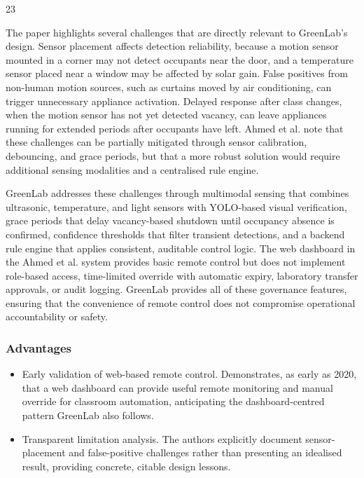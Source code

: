23


The paper highlights several challenges that are directly relevant to GreenLab's design. Sensor placement affects detection reliability, because a motion sensor mounted in
a corner may not detect occupants near the door, and a temperature sensor placed near a
window may be affected by solar gain. False positives from non-human motion sources,
such as curtains moved by air conditioning, can trigger unnecessary appliance activation.
Delayed response after class changes, when the motion sensor has not yet detected vacancy,
can leave appliances running for extended periods after occupants have left. Ahmed et al.
note that these challenges can be partially mitigated through sensor calibration, debouncing, and grace periods, but that a more robust solution would require additional sensing
modalities and a centralised rule engine.

GreenLab addresses these challenges through multimodal sensing that combines ultrasonic, temperature, and light sensors with YOLO-based visual veriﬁcation, grace periods that delay vacancy-based shutdown until occupancy absence is conﬁrmed, conﬁdence
thresholds that ﬁlter transient detections, and a backend rule engine that applies consistent,
auditable control logic. The web dashboard in the Ahmed et al. system provides basic
remote control but does not implement role-based access, time-limited override with automatic expiry, laboratory transfer approvals, or audit logging. GreenLab provides all of these
governance features, ensuring that the convenience of remote control does not compromise
operational accountability or safety.




\subsubsection*{Advantages}



\begin{itemize}
  \item Early validation of web-based remote control. Demonstrates, as early as 2020,
that a web dashboard can provide useful remote monitoring and manual override
for classroom automation, anticipating the dashboard-centred pattern GreenLab also
follows.
\end{itemize}

\begin{itemize}
  \item Transparent limitation analysis. The authors explicitly document sensor-placement
and false-positive challenges rather than presenting an idealised result, providing
concrete, citable design lessons.
\end{itemize}

